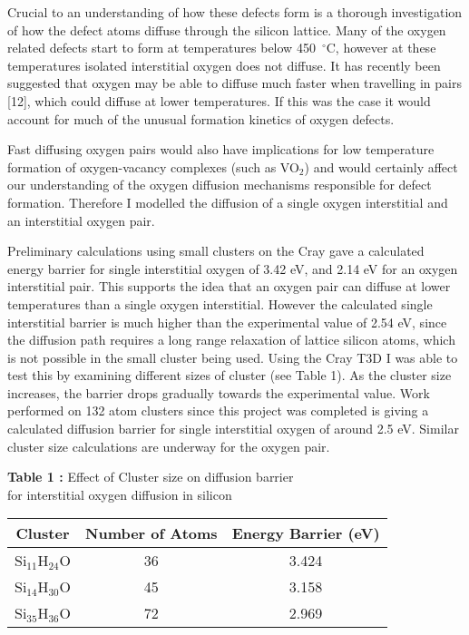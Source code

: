 {Crucial to an understanding of how these defects form is a thorough
investigation of how the defect atoms diffuse through the silicon
lattice.  Many of the oxygen related defects start to form at
temperatures below 450~$^\circ$C, however at these temperatures
isolated interstitial oxygen does not diffuse.  It has recently been
suggested that oxygen may be able to diffuse much faster when
travelling in pairs [12], which could diffuse at lower
temperatures. If this was the case it would account for much of the
unusual formation kinetics of oxygen defects.

Fast diffusing oxygen pairs would also have implications for low
temperature formation of oxygen-vacancy complexes (such as VO$_2$) and
would certainly affect our understanding of the oxygen diffusion
mechanisms responsible for defect formation.  Therefore I modelled the
diffusion of a single oxygen interstitial and an interstitial oxygen
pair.

Preliminary calculations using small clusters on the Cray gave a
calculated energy barrier for single interstitial oxygen of 3.42 eV,
and 2.14 eV for an oxygen interstitial pair.  This supports the idea
that an oxygen pair can diffuse at lower temperatures than a single
oxygen interstitial.  However the calculated single interstitial
barrier is much higher than the experimental value of 2.54 eV, since
the diffusion path requires a long range relaxation of lattice silicon
atoms, which is not possible in the small cluster being used.  Using
the Cray T3D I was able to test this by examining different sizes of
cluster (see Table 1).  As the cluster size increases, the barrier
drops gradually towards the experimental value.  Work performed on 132
atom clusters since this project was completed is giving a calculated
diffusion barrier for single interstitial oxygen of around 2.5 eV.
Similar cluster size calculations are underway for the oxygen pair.

\bigskip 

\begin{center}
{\bf Table 1 :} Effect of Cluster size on diffusion barrier \\ 
for interstitial oxygen diffusion in silicon\\
\begin{tabular}{ccc} \hline
Cluster & Number of Atoms & Energy Barrier (eV) \\ \hline
Si$_{11}$H$_{24}$O & 36 & 3.424 \\
Si$_{14}$H$_{30}$O & 45 & 3.158 \\
Si$_{35}$H$_{36}$O & 72 & 2.969 \\ \hline
\end{tabular}
\end{center}

}

